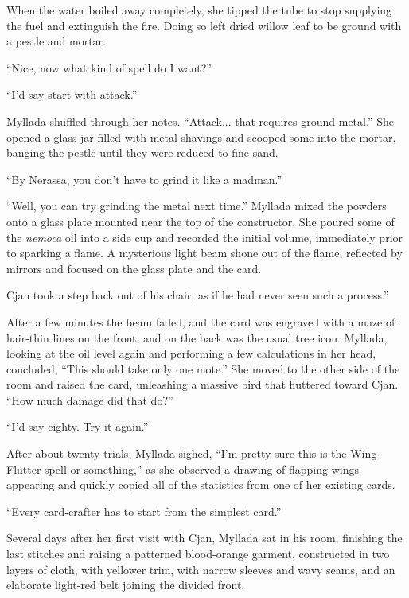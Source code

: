 When the water boiled away completely, she tipped the tube to stop supplying the fuel and extinguish the fire. Doing so left dried willow leaf to be ground with a pestle and mortar.

``Nice, now what kind of spell do I want?''

``I'd say start with attack.''

Myllada shuffled through her notes. ``Attack... that requires ground metal.'' She opened a glass jar filled with metal shavings and scooped some into the mortar, banging the pestle until they were reduced to fine sand.

``By Nerassa, you don't have to grind it like a madman.''

``Well, you can try grinding the metal next time.'' Myllada mixed the powders onto a glass plate mounted near the top of the constructor. She poured some of the \emph{nemoca} oil into a side cup and recorded the initial volume, immediately prior to sparking a flame. A mysterious light beam shone out of the flame, reflected by mirrors and focused on the glass plate and the card.

Cjan took a step back out of his chair, as if he had never seen such a process.''

After a few minutes the beam faded, and the card was engraved with a maze of hair-thin lines on the front, and on the back was the usual tree icon. Myllada, looking at the oil level again and performing a few calculations in her head, concluded, ``This should take only one mote.'' She moved to the other side of the room and raised the card, unleashing a massive bird that fluttered toward Cjan. ``How much damage did that do?''

``I'd say eighty. Try it again.''

After about twenty trials, Myllada sighed, ``I'm pretty sure this is the Wing Flutter spell or something,'' as she observed a drawing of flapping wings appearing and quickly copied all of the statistics from one of her existing cards.

``Every card-crafter has to start from the simplest card.''

\centeredstars

Several days after her first visit with Cjan, Myllada sat in his room, finishing the last stitches and raising a patterned blood-orange garment, constructed in two layers of cloth, with yellower trim, with narrow sleeves and wavy seams, and an elaborate light-red belt joining the divided front.

